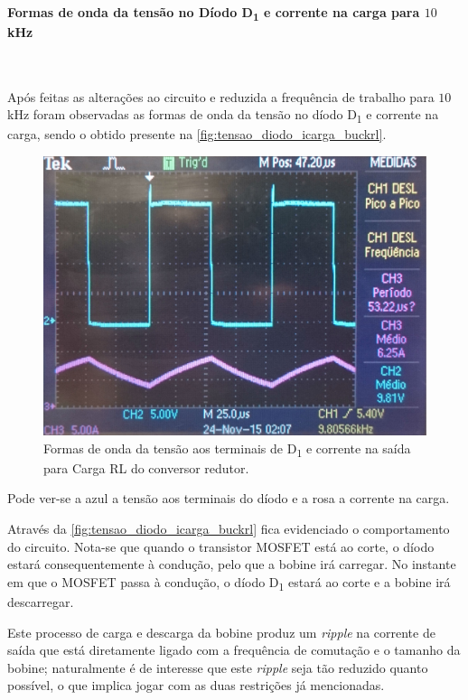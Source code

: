 \documentclass[a4paper,11pt]{article}
\numberwithin{equation}{section}
\begin{document}
\paragraph{Formas de onda da tensão no Díodo D\textsubscript{1} e corrente na carga para $10$ kHz}\mbox{}\

Após feitas as alterações ao circuito e reduzida a frequência de trabalho para $10$ kHz foram observadas as formas de onda da tensão no díodo D\textsubscript{1} e corrente na carga, sendo o obtido presente na \autoref{fig:tensao_diodo_icarga_buckrl}.

\begin{figure}[H]
	\centering
	\includegraphics[keepaspectratio=true, scale=0.13]{img/figs/tensao_diodo_icarga_buckrl}
	\caption{Formas de onda da tensão aos terminais de D\textsubscript{1} e corrente na saída para Carga RL do conversor redutor.}
	\label{fig:tensao_diodo_icarga_buckrl}
	\vspace{-0.8em}
\end{figure} 

Pode ver-se a azul a tensão aos terminais do díodo e a rosa a corrente na carga.

Através da \autoref{fig:tensao_diodo_icarga_buckrl} fica evidenciado o comportamento do circuito. Nota-se que quando o transistor MOSFET está ao corte, o díodo estará consequentemente à condução, pelo que a bobine irá carregar. No instante em que o MOSFET passa à condução, o díodo D\textsubscript{1} estará ao corte e a bobine irá descarregar. 

Este processo de carga e descarga da bobine produz um \textit{ripple} na corrente de saída que está diretamente ligado com a frequência de comutação e o tamanho da bobine; naturalmente é de interesse que este \textit{ripple} seja tão reduzido quanto possível, o que implica jogar com as duas restrições já mencionadas.
\end{document}
